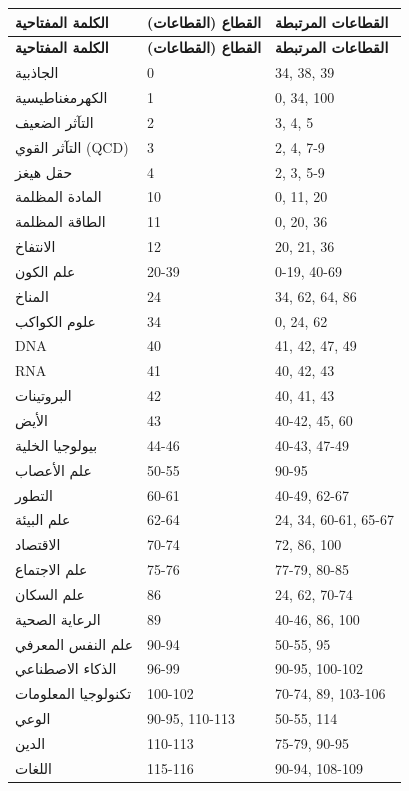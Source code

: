\documentclass[13pt,a4paper]{article}
\begin{document}
	\begin{longtable}{|p{5cm}|p{3cm}|p{4cm}|}
		\hline
		\textbf{الكلمة المفتاحية} & \textbf{القطاع (القطاعات)} & \textbf{القطاعات المرتبطة} \\
		\hline
		\endfirsthead
		\hline
		\textbf{الكلمة المفتاحية} & \textbf{القطاع (القطاعات)} & \textbf{القطاعات المرتبطة} \\
		\hline
		\endhead
		
		الجاذبية & 0 & 34, 38, 39 \\
		الكهرمغناطيسية & 1 & 0, 34, 100 \\
		التآثر الضعيف & 2 & 3, 4, 5 \\
		التآثر القوي (QCD) & 3 & 2, 4, 7-9 \\
		حقل هيغز & 4 & 2, 3, 5-9 \\
		المادة المظلمة & 10 & 0, 11, 20 \\
		الطاقة المظلمة & 11 & 0, 20, 36 \\
		الانتفاخ & 12 & 20, 21, 36 \\
		علم الكون & 20-39 & 0-19, 40-69 \\
		المناخ & 24 & 34, 62, 64, 86 \\
		علوم الكواكب & 34 & 0, 24, 62 \\
		DNA & 40 & 41, 42, 47, 49 \\
		RNA & 41 & 40, 42, 43 \\
		البروتينات & 42 & 40, 41, 43 \\
		الأيض & 43 & 40-42, 45, 60 \\
		بيولوجيا الخلية & 44-46 & 40-43, 47-49 \\
		علم الأعصاب & 50-55 & 90-95 \\
		التطور & 60-61 & 40-49, 62-67 \\
		علم البيئة & 62-64 & 24, 34, 60-61, 65-67 \\
		الاقتصاد & 70-74 & 72, 86, 100 \\
		علم الاجتماع & 75-76 & 77-79, 80-85 \\
		علم السكان & 86 & 24, 62, 70-74 \\
		الرعاية الصحية & 89 & 40-46, 86, 100 \\
		علم النفس المعرفي & 90-94 & 50-55, 95 \\
		الذكاء الاصطناعي & 96-99 & 90-95, 100-102 \\
		تكنولوجيا المعلومات & 100-102 & 70-74, 89, 103-106 \\
		الوعي & 90-95, 110-113 & 50-55, 114 \\
		الدين & 110-113 & 75-79, 90-95 \\
		اللغات & 115-116 & 90-94, 108-109 \\
		\hline
	\end{longtable}
	
\end{document}
